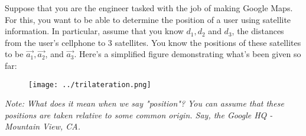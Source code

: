 Suppose that you are the engineer tasked with the job of making Google Maps. For this, you want to be able to determine the position of a user using satellite information. In particular, assume that you know $d_1, d_2$ and $d_3$, the distances from the user's cellphone to 3 satellites. You know the positions of these satellites to be $\vec{a_1}, \vec{a_2}$, and $\vec{a_3}$. Here's a simplified figure demonstrating what's been given so far:

\begin{figure}[H]
    \centering
    \texttt{[image: ../trilateration.png]}
\end{figure}

\textit{Note: What does it mean when we say "position"? You can assume that these positions are taken relative to some common origin. Say, the Google HQ - Mountain View, CA.}

